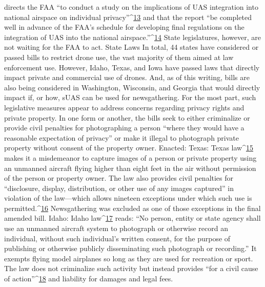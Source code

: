 directs the FAA ``to conduct a study on the implications of UAS integration
into national airspace on individual privacy''^{\href{#endnotes-waite-and-osterreicher}{13}} and that the report ``be completed
well in advance of the FAA's schedule for developing final regulations
on the integration of UAS into the national airspace.''^{\href{#endnotes-waite-and-osterreicher}{14}}
State legislatures, however, are not waiting for the FAA to act.
State Laws
In total, 44 states have considered or passed bills to restrict drone use, the
vast majority of them aimed at law enforcement use. However, Idaho, Texas,
and Iowa have passed laws that directly impact private and commercial use
of drones. And, as of this writing, bills are also being considered in Washington, Wisconsin, and Georgia that would directly impact if, or how, sUAS
can be used for newsgathering. For the most part, such legislative measures
appear to address concerns regarding privacy rights and private property.
In one form or another, the bills seek to either criminalize or provide civil
penalties for photographing a person ``where they would have a reasonable
expectation of privacy'' or make it illegal to photograph private property
without consent of the property owner.
Enacted:
Texas: Texas law^{\href{#endnotes-waite-and-osterreicher}{15}} makes it a misdemeanor to capture images of a person or
private property using an unmanned aircraft flying higher than eight feet in
the air without permission of the person or property owner. The law also
provides civil penalties for ``disclosure, display, distribution, or other use of
any images captured'' in violation of the law—which allows nineteen exceptions
under which such use is permitted.^{\href{#endnotes-waite-and-osterreicher}{16}} Newsgathering was excluded as
one of those exceptions in the final amended bill.
Idaho: Idaho law^{\href{#endnotes-waite-and-osterreicher}{17}} reads: ``No person, entity or state agency shall use an
unmanned aircraft system to photograph or otherwise record an individual,
without such individual's written consent, for the purpose of publishing or
otherwise publicly disseminating such photograph or recording.'' It exempts
flying model airplanes so long as they are used for recreation or sport. The
law does not criminalize such activity but instead provides ``for a civil cause
of action''^{\href{#endnotes-waite-and-osterreicher}{18}} and liability for damages and legal fees.

